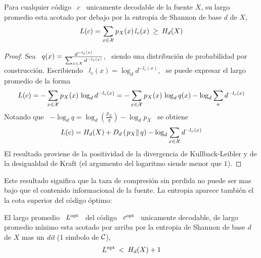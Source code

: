 \begin{teorema}
  Para cualquier  c\'odigo \  $c$ \  unicamente decodable de  la fuente  $X$, su
  largo promedio esta acotado por debajo  por la entropia de Shannon de base $d$
  de $X$,
  \[
  L(c) = \sum_{x \in \mathcal{X}} p_X(x) \, l_c(x) \: \ge \: H_d(X)
  \]
\end{teorema}
%
\begin{proof}
  Sea \ $q(x)  = \frac{d^{-l_c(x)}}{\sum_{x \in \mathcal{X}} d^{-l_c(x)}}$,  \ siendo una
  distribuci\'on de  probabilidad por  construcci\'on.  Escribiendo \  $l_c(x) =
  \log_d d^{-l_c(x)}$, \ se puede expresar el largo promedio de la forma
  \[
  L(c) =  - \sum_{x  \in \mathcal{X}}  p_X(x) \, \log_d  d^{-l_c(x)} =  - \sum_{x  \in \mathcal{X}}
  p_X(x) \, \log_d q(x) - \log_d \sum_a d^{-l_c(x)}
  \]
  Notando que \ $- \log_d q  = \log_d \left( \frac{p_X}{q} \right) - \log_d p_X$
  \ se obtiene
  \[
  L(c) = H_d(X)  + D_d\left( \left.  p_X \right\| q \right)  - \log_d \sum_{x \in
    \mathcal{X}} d^{-l_c(x)}
  \]
  El resultado proviene de la  positividad de la divergencia de Kullback-Leibler
  y de  la desigualdad  de Kraft  (el argumento del  logaritmo siende  menor que
  $1$).
\end{proof}
%
Este resultado  significa que la taza  de compresi\'on sin perdida  no puede ser
mas  bajo que  el  contenido informacional  de  la fuente.  La entropia  aparece
tambi\'en el la cota superior del c\'odigo \'optimo:
%
\begin{teorema}
  El largo promedio \ $L^{\mathrm{opt}}$ \ del c\'odigo \ $c^{\mathrm{opt}}$ \ unicamente decodable,
  de largo promedio m\'inimo esta acotado  por arriba por la entropia de Shannon
  de base $d$ de $X$ mas un {\it dit} (1 simbolo de $\mathcal{C}$), 
  \[
  L^{\mathrm{opt}} \: < \: H_d(X) + 1
  \]
\end{teorema}
%
